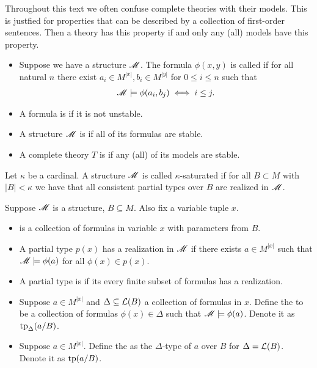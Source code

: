 Throughout this text we often confuse complete theories with their models.
This is justfied for properties that can be described by a collection of first-order sentences.
Then a theory has this property if and only any (all) models have this property.

\begin{Definition}
  \begin{itemize}
  \item Suppose we have a structure $\mathscr M$.
    The formula $\phi(x,y)$ is called  if for all natural $n$
    there exist $a_i \in M^{|x|}, b_i \in M^{|y|}$ for $0 \leq i \leq n$ such that
    \begin{align*}
      \mathscr M \models \phi(a_i, b_j) \iff i \leq j.
    \end{align*}
  \item A formula is  if it is not unstable.
  \item A structure $\mathscr M$ is  if all of its formulas are stable.
  \item A complete theory $T$ is  if any (all) of its models are stable.
  \end{itemize}
\end{Definition}

\begin{Definition}
  Let $\kappa$ be a cardinal.
  A structure $\mathscr M$ is called $\kappa$-saturated if for all $B \subset M$ with $|B| < \kappa$
  we have that all consistent partial types over $B$ are realized in $\mathscr M$.
\end{Definition}

\begin{Definition}
  Suppose $\mathscr M$ is a structure, $B \subseteq M$.
  Also fix a variable tuple $x$.
  \begin{itemize}
  \item {} is a collection of formulas in variable $x$ with parameters from $B$.
  \item A partial type $p(x)$ has a realization in $\mathscr M$ if there exists $a \in M^{|x|}$ such that
    $\mathscr M \models \phi(a)$ for all $\phi(x) \in p(x)$.
  \item A partial type is  if its every finite subset of formulas has a realization.
  \item Suppose $a \in M^{|x|}$ and $\Delta \subseteq \mathcal L(B)$ a collection of formulas in $x$.
    Define the  to be a collection of formulas $\phi(x) \in \Delta$
    such that $\mathscr M \models \phi(a)$.
    Denote it as $\operatorname{tp}_{\Delta}(a/B)$.
  \item Suppose $a \in M^{|x|}$.
    Define the  as the $\Delta$-type of $a$ over $B$ for $\Delta = \mathcal L(B)$.
    Denote it as $\operatorname{tp}(a/B)$.
  \end{itemize}
\end{Definition}

